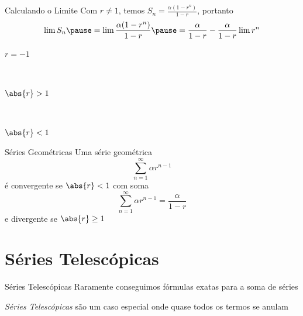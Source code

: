 \begin{frame}{Calculando o Limite}
	Com $r\neq 1$, temos \(S_n = \frac{\alpha(1-r^n)}{1-r}\),
  \pause
  portanto
  \[
    \lim S_n
    \pause
    = \lim \frac{\alpha(1-r^n)}{1-r}
    \pause
    = \frac{\alpha}{1-r} -\frac{\alpha}{1-r} \lim r^n
  \]
  \pause
  \vspace{-\baselineskip}
	\begin{description}
		\item[$r=-1$] \tabto{10mm}
		 \\[7mm]
		\item[$\abs{r}>1$] \tabto{10mm}
		 \\[7mm]
		\item[$\abs{r}<1$] \tabto{10mm}
	\end{description}
\end{frame}

\begin{frame}{Séries Geométricas}
	Uma série geométrica
	\[
    \sum_{n=1}^\infty \alpha r^{n-1}
  \]
	é convergente se $\abs{r}<1$ com soma
	\[
    \sum_{n=1}^\infty \alpha r^{n-1} = \frac{\alpha }{1-r}
  \]
	e divergente se $\abs{r}\geq 1$
\end{frame}

\section{Séries Telescópicas}

\begin{frame}{Séries Telescópicas}
	Raramente conseguimos fórmulas exatas para a soma de séries

	\pause
	\vspace{\baselineskip}
	\emph{Séries Telescópicas} são um caso especial onde quase todos os termos se anulam
\end{frame}

